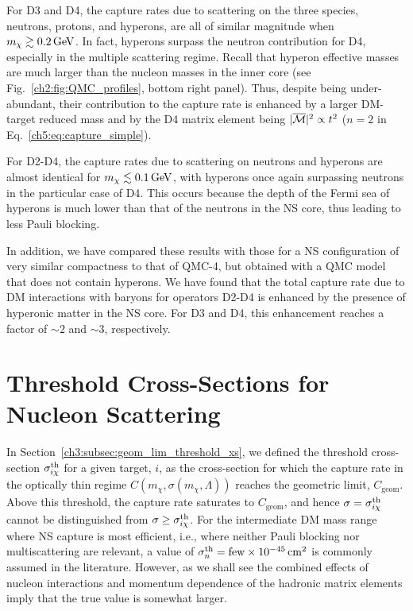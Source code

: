 For D3 and D4, the capture rates due to scattering on the three species, neutrons, protons, and hyperons, are all of similar magnitude when $m_\chi\gtrsim0.2{\rm \,GeV}$. In fact, hyperons surpass the neutron contribution for D4, especially in the multiple scattering regime.  Recall that hyperon effective masses are much larger than the nucleon masses in the inner core (see Fig.~\ref{ch2:fig:QMC_profiles}, bottom right panel). Thus, despite being under-abundant, their contribution to the capture rate is enhanced by a larger DM-target reduced mass and by the D4 matrix element being $|\overline{\mathcal M}|^2\propto t^2$ ($n=2$ in  Eq.~\ref{ch5:eq:capture_simple}). 

For D2-D4, the capture rates due to scattering on neutrons and hyperons are almost identical for $m_\chi\lesssim0.1{\rm \,GeV}$, with hyperons once again surpassing neutrons in the particular case of D4.  This occurs because the depth of the Fermi sea of hyperons is much lower than that of the neutrons in the NS core, thus leading to less Pauli blocking. 

In addition, we have compared these results with those for a NS configuration of very similar compactness to that of QMC-4, but obtained with a QMC model that does not contain hyperons. We have found that the total capture rate due to DM interactions with baryons for operators D2-D4 is enhanced by the presence of hyperonic matter in the NS core. For D3 and D4, this enhancement reaches a factor of $\sim 2$ and $\sim 3$, respectively.


\section{Threshold Cross-Sections for Nucleon Scattering}
\label{ch5:sec:sigmath_results}



In Section~\ref{ch3:subsec:geom_lim_threshold_xs}, we defined the threshold cross-section $\sigma^{\rm th}_{i\chi}$ for a given target, $i$, as the cross-section for which the capture rate in the optically thin regime $C(m_\chi,\sigma(m_\chi,\Lambda))$ reaches the geometric limit, $C_\mathrm{geom}$. Above this threshold, the capture rate saturates to $C_\mathrm{geom}$, and hence $\sigma = \sigma^{\rm th}_{i\chi}$ cannot be distinguished from $\sigma\ge\sigma^{\rm th}_{i\chi}$. For the intermediate DM mass range where NS capture is most efficient, i.e., where neither Pauli blocking nor multiscattering are relevant, a value of $\sigma^\mathrm{th}_n = \textrm{few}\times10^{-45}{\rm \,cm}^2$ is commonly assumed in the literature.  However, as we shall see the combined effects of nucleon interactions and momentum dependence of the hadronic matrix elements imply that the true value is somewhat larger. 


